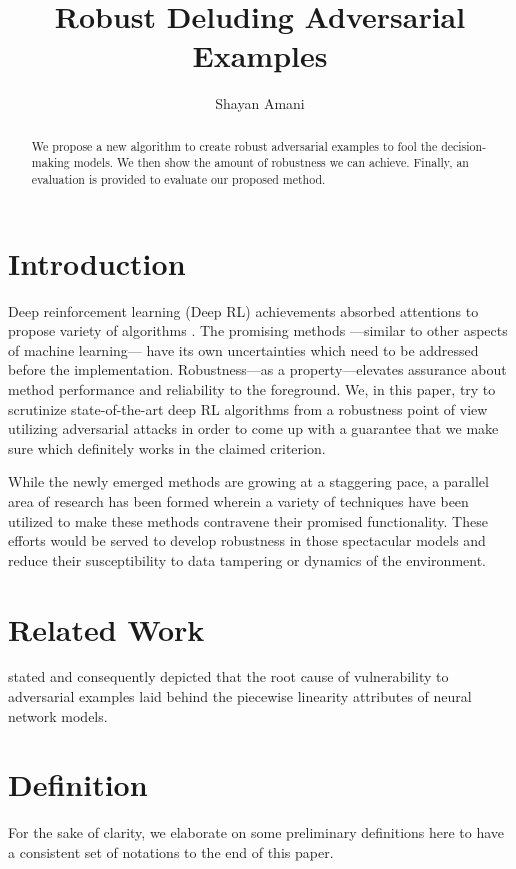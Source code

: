 \documentclass[letterpaper,12pt]{article}
\title{Robust Deluding Adversarial Examples}
\author{Shayan Amani}
\begin{document}
\maketitle

\begin{abstract}
We propose a new algorithm to create robust adversarial examples to fool the decision-making models. We then show the amount of robustness we can achieve. Finally, an evaluation is provided to evaluate our proposed method.
\end{abstract}

\section{Introduction}
Deep reinforcement learning (Deep RL) achievements \cite{Mnih2013PlayingLearning} absorbed attentions to propose variety of algorithms \cite{Haarnoja2018SoftActor, Espeholt2018Impala:Architectures, Pong2018TemporalControl}. The promising methods ---similar to other aspects of machine learning--- have its own uncertainties which need to be addressed before the implementation. Robustness---as a property---elevates assurance about method performance and reliability to the foreground. We, in this paper, try to scrutinize state-of-the-art deep RL algorithms from a robustness point of view utilizing adversarial attacks in order to come up with a guarantee that we make sure which definitely works in the claimed criterion.

While the newly emerged methods are growing at a staggering pace, a parallel area of research has been formed wherein a variety of techniques have been utilized to make these methods contravene their promised functionality. These efforts would be served to develop robustness in those spectacular models and reduce their susceptibility to data tampering or dynamics of the environment.

\section{Related Work}
\citet{Goodfellow2014} stated and consequently depicted that the root cause of vulnerability to adversarial examples laid behind the piecewise linearity attributes of neural network models.

\section{Definition}
For the sake of clarity, we elaborate on some preliminary definitions here to have a consistent set of notations to the end of this paper.
\end{document}
